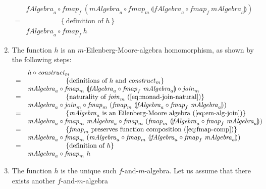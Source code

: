\documentclass{jfp1}
\newcommand{\fold}[1]{\llparenthesis #1 \rrparenthesis}
\newcommand{\eqAnnotation}[1]{\hspace{2cm}\left\{\textrm{#1}\right\}}
\begin{document}
\begin{proof*}
\begin{enumerate}
\begin{displaymath}
\begin{array}{cl}
         &\mathit{fAlgebra}_a \circ \mathit{fmap}_f~(\mathit{mAlgebra}_a \circ \mathit{fmap_m}~\fold{\mathit{fAlgebra}_a \circ \mathit{fmap}_f~\mathit{mAlgebra}_a}) \\
        =&\eqAnnotation{definition of $h$} \\
         & \mathit{fAlgebra}_a \circ \mathit{fmap}_f~h
      \end{array}
    \end{displaymath}
  \item The function $h$ is an $m$-Eilenberg-Moore-algebra
    homomorphism, as shown by the following steps:
    \begin{displaymath}
      \begin{array}{cl}
        & h \circ \mathit{construct_m} \\
        =&\eqAnnotation{definitions of $h$ and $\mathit{construct}_m$} \\
         &\mathit{mAlgebra}_a \circ \mathit{fmap}_m~\fold{\mathit{fAlgebra}_a \circ \mathit{fmap}_f~\mathit{mAlgebra}_a} \circ \mathit{join}_m \\
        =&\eqAnnotation{naturality of $\mathit{join}_m$ (\autoref{eq:monad-join-natural})} \\
         &\mathit{mAlgebra}_a \circ \mathit{join}_m \circ \mathit{fmap}_m~(\mathit{fmap}_m~\fold{\mathit{fAlgebra}_a \circ \mathit{fmap}_f~\mathit{mAlgebra}_a}) \\
        =&\eqAnnotation{$\mathit{mAlgebra}_a$ is an Eilenberg-Moore algebra (\autoref{eq:em-alg-join})} \\
         &\mathit{mAlgebra}_a \circ \mathit{fmap}_m~\mathit{mAlgebra}_a \circ \mathit{fmap}_m~(\mathit{fmap}_m~\fold{\mathit{fAlgebra}_a \circ \mathit{fmap}_f~\mathit{mAlgebra}_a}) \\
        =&\eqAnnotation{$\mathit{fmap}_m$ preserves function composition (\autoref{eq:fmap-comp})} \\
         &\mathit{mAlgebra}_a \circ \mathit{fmap}_m~(\mathit{mAlgebra}_a \circ \mathit{fmap}_m~\fold{\mathit{fAlgebra}_a \circ \mathit{fmap}_f~\mathit{mAlgebra}_a}) \\
        =&\eqAnnotation{definition of $h$} \\
         &\mathit{mAlgebra}_a \circ \mathit{fmap}_m~h
      \end{array}
    \end{displaymath}
  \item The function $h$ is the unique such $f$-and-$m$-algebra. Let
    us assume that there exists another $f$-and-$m$-algebra

\end{enumerate}
\end{proof*}
\end{document}
